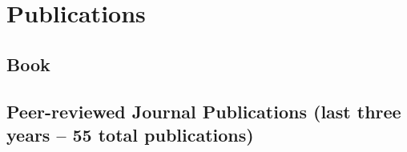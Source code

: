 \section*{Publications}

\subsection*{Book}

\begin{timeline}
 \libropython
\end{timeline}

\subsection*{ Peer-reviewed Journal Publications (last three years -- 55 total publications)}
\renewcommand{\cvminyear}{2023}
\begin{ntimeline}
	
\end{ntimeline}

